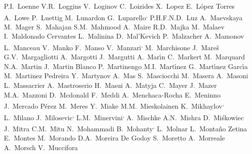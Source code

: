 \begin{flushleft}
P.I.~Loenne\And
V.R.~Loggins\And
V.~Loginov\And
C.~Loizides\And
X.~Lopez\And
E.~L\'{o}pez Torres\And
A.~Lowe\And
P.~Luettig\And
M.~Lunardon\And
G.~Luparello\textsuperscript{,}\And
P.H.F.N.D.~Luz\And
A.~Maevskaya\And
M.~Mager\And
S.~Mahajan\And
S.M.~Mahmood\And
A.~Maire\And
R.D.~Majka\And
M.~Malaev\And
I.~Maldonado Cervantes\And
L.~Malinina\And
D.~Mal'Kevich\And
P.~Malzacher\And
A.~Mamonov\And
L.~Manceau\And
V.~Manko\And
F.~Manso\And
V.~Manzari\textsuperscript{,}\And
M.~Marchisone\And
J.~Mare\v{s}\And
G.V.~Margagliotti\And
A.~Margotti\And
J.~Margutti\And
A.~Mar\'{\i}n\And
C.~Markert\And
M.~Marquard\And
N.A.~Martin\And
J.~Martin Blanco\And
P.~Martinengo\And
M.I.~Mart\'{\i}nez\And
G.~Mart\'{\i}nez Garc\'{\i}a\And
M.~Martinez Pedreira\And
Y.~Martynov\And
A.~Mas\And
S.~Masciocchi\And
M.~Masera\And
A.~Masoni\And
L.~Massacrier\And
A.~Mastroserio\And
H.~Masui\And
A.~Matyja\And
C.~Mayer\And
J.~Mazer\And
M.A.~Mazzoni\And
D.~Mcdonald\And
F.~Meddi\And
A.~Menchaca-Rocha\And
E.~Meninno\And
J.~Mercado P\'erez\And
M.~Meres\And
Y.~Miake\And
M.M.~Mieskolainen\And
K.~Mikhaylov\textsuperscript{,}\And
L.~Milano\And
J.~Milosevic\textsuperscript{,}\And
L.M.~Minervini\textsuperscript{,}\And
A.~Mischke\And
A.N.~Mishra\And
D.~Mi\'{s}kowiec\And
J.~Mitra\And
C.M.~Mitu\And
N.~Mohammadi\And
B.~Mohanty\textsuperscript{,}\And
L.~Molnar\And
L.~Monta\~{n}o Zetina\And
E.~Montes\And
M.~Morando\And
D.A.~Moreira De Godoy\And
S.~Moretto\And
A.~Morreale\And
A.~Morsch\And
V.~Muccifora\And

\end{flushleft}

